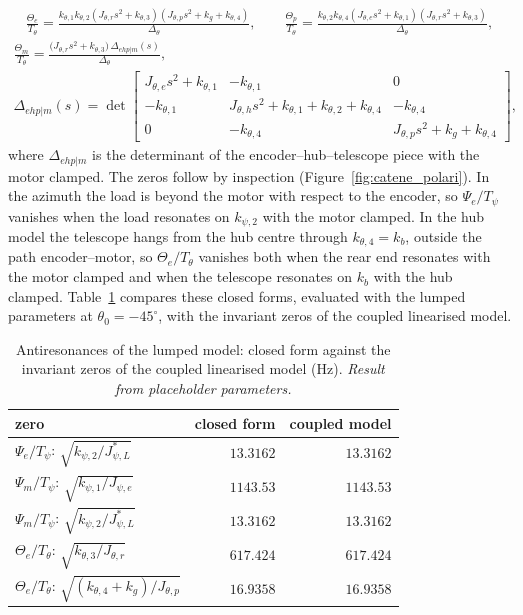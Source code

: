 \documentclass[10pt,a4paper]{article}
\numberwithin{equation}{section}
\begin{document}
\begin{gather}
\frac{\Theta_e}{T_\theta} = \frac{k_{\theta,1} k_{\theta,2} \left(J_{\theta,r} s^{2} + k_{\theta,3}\right) \left(J_{\theta,p} s^{2} + k_{g} + k_{\theta,4}\right)}{\Delta_\theta},\qquad \frac{\Theta_p}{T_\theta} = \frac{k_{\theta,2} k_{\theta,4} \left(J_{\theta,e} s^{2} + k_{\theta,1}\right) \left(J_{\theta,r} s^{2} + k_{\theta,3}\right)}{\Delta_\theta},
\end{gather}
\begin{gather}
\frac{\Theta_m}{T_\theta} = \frac{\bigl(J_{\theta,r}s^2 + k_{\theta,3}\bigr)\,\Delta_{ehp|m}(s)}{\Delta_\theta}, \\ \Delta_{ehp|m}(s) = \det\left[\begin{matrix}J_{\theta,e} s^{2} + k_{\theta,1} & - k_{\theta,1} & 0\\- k_{\theta,1} & J_{\theta,h} s^{2} + k_{\theta,1} + k_{\theta,2} + k_{\theta,4} & - k_{\theta,4}\\0 & - k_{\theta,4} & J_{\theta,p} s^{2} + k_{g} + k_{\theta,4}\end{matrix}\right],
\end{gather}
where $\Delta_{ehp|m}$ is the determinant of the encoder--hub--telescope piece with the motor clamped.
The zeros follow by inspection (Figure~\ref{fig:catene_polari}). In the azimuth the load is beyond the motor with respect to the encoder, so $\Psi_e/T_\psi$ vanishes when the load resonates on $k_{\psi,2}$ with the motor clamped. In the hub model the telescope hangs from the hub centre through $k_{\theta,4} = k_b$, outside the path encoder--motor, so $\Theta_e/T_\theta$ vanishes both when the rear end resonates with the motor clamped and when the telescope resonates on $k_b$ with the hub clamped. Table~\ref{tab:lump_zeros} compares these closed forms, evaluated with the lumped parameters at $\theta_0 = -45^\circ$, with the invariant zeros of the coupled linearised model.
\begin{table}[H]\centering\small
\caption{Antiresonances of the lumped model: closed form against the invariant zeros of the coupled linearised model (Hz). \emph{Result from placeholder parameters.}}\label{tab:lump_zeros}
\begin{tabular}{lrr}\toprule
zero & closed form & coupled model \\ \midrule
$\Psi_e/T_\psi$: $\sqrt{k_{\psi,2}/J_{\psi,L}^*}$ & $13.3162$ & $13.3162$ \\
$\Psi_m/T_\psi$: $\sqrt{k_{\psi,1}/J_{\psi,e}}$ & $1143.53$ & $1143.53$ \\
$\Psi_m/T_\psi$: $\sqrt{k_{\psi,2}/J_{\psi,L}^*}$ & $13.3162$ & $13.3162$ \\
$\Theta_e/T_\theta$: $\sqrt{k_{\theta,3}/J_{\theta,r}}$ & $617.424$ & $617.424$ \\
$\Theta_e/T_\theta$: $\sqrt{(k_{\theta,4} + k_g)/J_{\theta,p}}$ & $16.9358$ & $16.9358$ \\
\bottomrule\end{tabular}\end{table}
\end{document}
